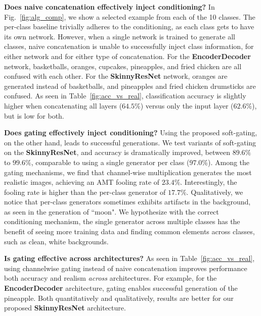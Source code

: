 \vspace{2mm} \noindent \textbf{Does naive concatenation effectively inject conditioning?} In Fig.~\ref{fig:alg_comp}, we show a selected example from each of the 10 classes. The per-class baseline trivially adheres to the conditioning, as each class gets to have its own network. However, when a single network is trained to generate all classes, naive concatenation is unable to successfully inject class information, for either network and for either type of concatenation. For the \textbf{EncoderDecoder} network, basketballs, oranges, cupcakes, pineapples, and fried chicken are all confused with each other. For the \textbf{SkinnyResNet} network, oranges are generated instead of basketballs, and pineapples and fried chicken drumsticks are confused. As seen in Table~\ref{fig:acc_vs_real}, classification accuracy is slightly higher when concatenating all layers ($64.5\%$) versus only the input layer ($62.6\%$), but is low for both.


\vspace{2mm} \noindent \textbf{Does gating effectively inject conditioning?} Using the proposed soft-gating, on the other hand, leads to successful generations. We test variants of soft-gating on the \textbf{SkinnyResNet}, and accuracy is dramatically improved, between $89.6\%$ to $99.6\%$, comparable to using a single generator per class ($97.0\%$).
Among the gating mechanisms, we find that channel-wise multiplication
generates the most realistic images, achieving an AMT fooling rate of $23.4\%$. Interestingly, the fooling rate is higher than the per-class generator of $17.7\%$. Qualitatively, we notice that per-class generators sometimes exhibits artifacts in the background, as seen in the generation of ``moon". We hypothesize with the correct conditioning mechanism, the single generator across multiple classes has the benefit of seeing more training data and finding common elements across classes, such as clean, white backgrounds.



\vspace{2mm} \noindent \textbf{Is gating effective across architectures?} 
As seen in Table~\ref{fig:acc_vs_real}, using channelwise gating instead of naive concatenation improves performance both accuracy and realism \textit{across} architectures. For example, for the \textbf{EncoderDecoder} architecture, gating enables successful generation of the pineapple.
Both quantitatively and qualitatively, results are better for our proposed \textbf{SkinnyResNet} architecture.

